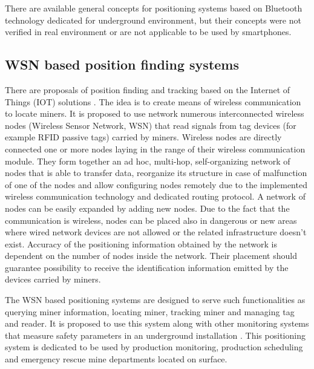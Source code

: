 \documentclass[../main.tex]{subfiles}
\begin{document}
There are available general concepts for positioning systems based on Bluetooth technology dedicated for underground environment, but their concepts were not verified in real environment \cite{thesis_tablet_positioning}\cite{positioning_tests} or are not applicable to be used by smartphones\cite{article_inertial_active_beacons_calculus_kalman}.



\subsection{WSN based position finding systems} %
\label{sub:wsn_based_position_finding_systems}

There are proposals of position finding and tracking based on the Internet of Things (IOT) solutions \cite{WSN_tracking, WSN_monitoring}. The idea is to create means of wireless communication to locate miners. It is proposed to use network numerous interconnected wireless nodes (Wireless Sensor Network, WSN) that read signals from tag devices (for example RFID passive tags) carried by miners. Wireless nodes are directly connected one or more nodes laying in the range of their wireless communication module. They form together an ad hoc, multi-hop, self-organizing network of nodes that is able to transfer data, reorganize its structure in case of malfunction of one of the nodes and allow configuring nodes remotely due to the implemented wireless communication technology and dedicated routing protocol. A network of nodes can be easily expanded by adding new nodes. Due to the fact that the communication is wireless, nodes can be placed also in dangerous or new areas where wired network devices are not allowed or the related infrastructure doesn't exist. Accuracy of the positioning information obtained by the network is dependent on the number of nodes inside the network. Their placement should guarantee possibility to receive the identification information emitted by the devices carried by miners.

The WSN based positioning systems are designed to serve such functionalities as querying miner information, locating miner, tracking miner and managing tag and reader. It is proposed to use this system along with other monitoring systems that measure safety parameters in an underground installation \cite{WSN_monitoring}. This positioning system is dedicated to be used by production monitoring, production scheduling and emergency rescue mine departments located on surface.
\end{document}
